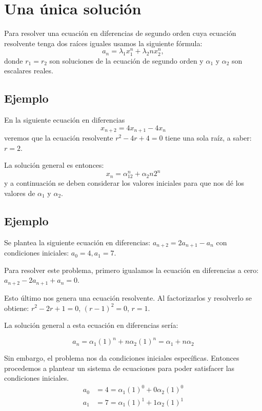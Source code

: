\documentclass{report}
\begin{document}
\section{Una única solución}
\label{sec:unica}

Para resolver una ecuación en diferencias de segundo orden cuya
ecuación resolvente tenga dos raíces iguales usamos la siguiente fórmula:
\begin{equation}
 \label{raicesiguales}
 a_n=\lambda_1x_1^n +\lambda_2nx_2^n,
\end{equation}
donde $r_1=r_2$ son soluciones de la ecuación de segundo orden y
$\alpha_1$ y $\alpha_2$ son escalares reales.

\subsection{Ejemplo}

En la siguiente ecuación en diferencias
\begin{equation}
  \label{eq:1}
  x_{n+2}=4x_{n+1}-4x_{n}
\end{equation}
veremos que la ecuación resolvente $r^2-4r+4=0$ tiene una sola raíz, a
saber: $r=2$.

La solución general es entonces:
$$x_n=\alpha_12^n+\alpha_2n2^n$$
y a continuación se deben considerar los valores iniciales para que
nos dé los valores de $\alpha_1$ y $\alpha_2$.

\subsection{Ejemplo}

Se plantea la siguiente ecuación en diferencias:
$a_{n+2}=2a_{n+1}-a_{n}$ con condiciones iniciales: $a_{0}=4, a_{1}=7$.

Para resolver este problema, primero igualamos la ecuación en diferencias a
cero: $a_{n+2}-2a_{n+1}+a_{n}=0$.

Esto último nos genera una ecuación resolvente. Al factorizarlos y
resolverlo se obtiene: $r^2-2r+1=0$, $(r-1)^2=0$, ${r=1}$.

La solución general a esta ecuación en diferencias sería:

$$a_{n}=\alpha_{1}(1)^n+n\alpha_{2}(1)^n=\alpha_{1}+n\alpha_{2}$$

Sin embargo, el problema nos da condiciones iniciales
específicas. Entonces procedemos a plantear un sistema de ecuaciones
para poder satisfacer las condiciones iniciales.
\begin{align*}
  a_{0}&=4=\alpha_{1}(1)^0+0\alpha_{2}(1)^0\\
  a_{1}&=7=\alpha_{1}(1)^1+1\alpha_{2}(1)^1
\end{align*}
\end{document}
